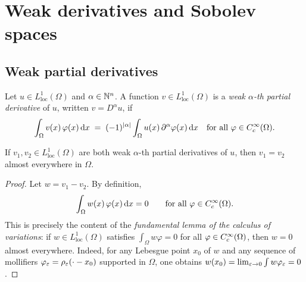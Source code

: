 \section{Weak derivatives and Sobolev spaces}\label{sec:sobolev}

\subsection{Weak partial derivatives}

\begin{definition}%
  \label{def:weak-deriv}
  Let $u \in L^{1}_{\mathrm{loc}}(\Omega)$ and $\alpha \in \mathbb{N}^{n}$.  A function
  $v \in L^{1}_{\mathrm{loc}}(\Omega)$ is a \emph{weak $\alpha$-th partial derivative} of
  $u$, written $v = D^{\alpha} u$, if
  \begin{equation}\label{eq:weak-deriv}
    \int_{\Omega} v(x)\,\varphi(x)\,\mathrm{d} x
    \;=\;
    (-1)^{\left\lvert \alpha \right\rvert}
    \int_{\Omega} u(x)\,\partial^{\alpha}\varphi(x)\,\mathrm{d} x
    \quad \text{for all } \varphi \in C^\infty_c(\Omega).
  \end{equation}
\end{definition}

\begin{theorem}%
  \label{thm:weak-deriv-unique}
  If $v_{1}, v_{2} \in L^{1}_{\mathrm{loc}}(\Omega)$ are both weak $\alpha$-th partial
  derivatives of $u$, then $v_{1} = v_{2}$ almost everywhere in $\Omega$.
\end{theorem}

\begin{proof}
  Let $w = v_{1} - v_{2}$.  By definition,
  \[
    \int_{\Omega} w(x)\,\varphi(x)\,\mathrm{d} x = 0
    \qquad \text{for all } \varphi \in C^\infty_c(\Omega).
  \]
  This is precisely the content of the \emph{fundamental lemma of the calculus of
  variations}: if $w \in L^{1}_{\mathrm{loc}}(\Omega)$ satisfies $\int_{\Omega} w \varphi
  = 0$ for all $\varphi \in C^\infty_c(\Omega)$, then $w = 0$ almost everywhere.  Indeed,
  for any Lebesgue point $x_{0}$ of $w$ and any sequence of mollifiers
  $\varphi_{\varepsilon} = \rho_{\varepsilon}(\cdot - x_{0})$ supported in $\Omega$, one obtains
  $w(x_{0}) = \lim_{\varepsilon \to 0} \int w \varphi_{\varepsilon} = 0$.
\end{proof}

